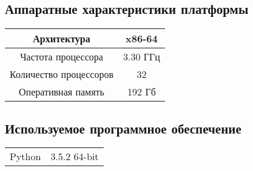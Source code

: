 
\appendix
{}
\renewcommand{\thesection}{\Asbuk{section}}

\intro{}\label{appendix:specs}

\singlespace

\subsection{ Аппаратные характеристики платформы }

\begin{tabular}{c|c}
	Архитектура            & x86-64   \\ \hline
	Частота процессора     & 3.30 ГГц \\ \hline
	Количество процессоров & 32       \\ \hline
	Оперативная память     & 192 Гб \\ 
\end {tabular}

\subsection{ Используемое программное обеспечение }

\begin{tabular}{c|c}
	Python            &  3.5.2 64-bit  \\
\end {tabular}